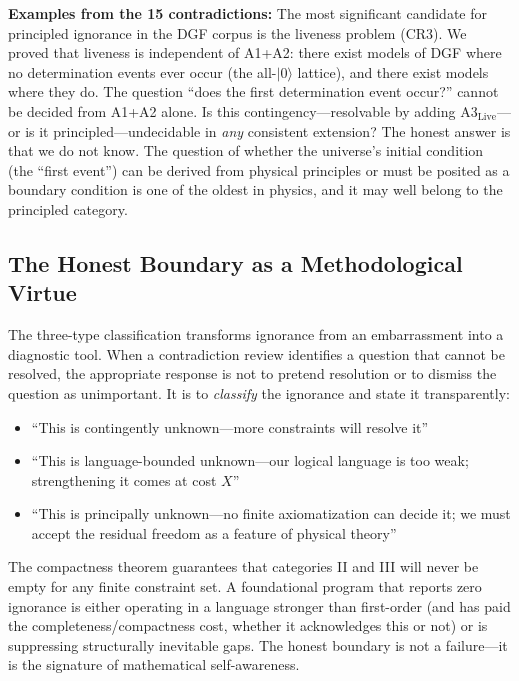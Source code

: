 \documentclass[12pt,a4paper]{article}
\theoremstyle{definition}
\theoremstyle{remark}
\begin{document}
\textbf{Examples from the 15 contradictions:} The most significant candidate for principled ignorance in the DGF corpus is the liveness problem (CR3). We proved that liveness is independent of A1+A2: there exist models of DGF where no determination events ever occur (the all-$|0\rangle$ lattice), and there exist models where they do. The question ``does the first determination event occur?'' cannot be decided from A1+A2 alone. Is this contingency---resolvable by adding A3$_{\mathrm{Live}}$---or is it principled---undecidable in \emph{any} consistent extension? The honest answer is that we do not know. The question of whether the universe's initial condition (the ``first event'') can be derived from physical principles or must be posited as a boundary condition is one of the oldest in physics, and it may well belong to the principled category.

\subsection{The Honest Boundary as a Methodological Virtue}

The three-type classification transforms ignorance from an embarrassment into a diagnostic tool. When a contradiction review identifies a question that cannot be resolved, the appropriate response is not to pretend resolution or to dismiss the question as unimportant. It is to \emph{classify} the ignorance and state it transparently:
\begin{itemize}[leftmargin=*,itemsep=0pt,topsep=0pt]
\item ``This is contingently unknown---more constraints will resolve it''
\item ``This is language-bounded unknown---our logical language is too weak; strengthening it comes at cost $X$''
\item ``This is principally unknown---no finite axiomatization can decide it; we must accept the residual freedom as a feature of physical theory''
\end{itemize}

The compactness theorem guarantees that categories II and III will never be empty for any finite constraint set. A foundational program that reports zero ignorance is either operating in a language stronger than first-order (and has paid the completeness/compactness cost, whether it acknowledges this or not) or is suppressing structurally inevitable gaps. The honest boundary is not a failure---it is the signature of mathematical self-awareness.
\end{document}
